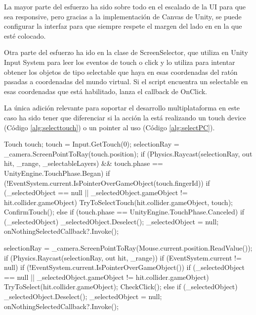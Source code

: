 La mayor parte del esfuerzo ha sido sobre todo en el escalado de la UI para que sea responsive, pero gracias a la implementación de Canvas\cite{unitycanvas} de Unity, se puede configurar la interfaz para que siempre respete el margen del lado en en la que esté colocado.

Otra parte del esfuerzo ha ido en la clase de ScreenSelector, que utiliza en Unity Input System\cite{unityinputsystem} para leer los eventos de touch o click y lo utiliza para intentar obtener los objetos de tipo selectable que haya en esas coordenadas del ratón pasadas a coordenadas del mundo virtual. Si el script encuentra un selectable en esas coordenadas que está habilitado, lanza el callback de OnClick.

La única adición relevante para soportar el desarrollo multiplataforma en este caso ha sido tener que diferenciar si la acción la está realizando un touch device (Código \ref{alg:selecttouch}) o un pointer al uso (Código \ref{alg:selectPC}).

\begin{mypython}[caption={Código para seleccionar una entidad en un 'Touch Device'.},label={alg:selecttouch}]
Touch touch;
touch = Input.GetTouch(0);
selectionRay = _camera.ScreenPointToRay(touch.position);
if (Physics.Raycast(selectionRay, out hit, _range, _selectableLayers) && touch.phase == UnityEngine.TouchPhase.Began)
{
    if (!EventSystem.current.IsPointerOverGameObject(touch.fingerId))
    {
        if (_selectedObject == null || _selectedObject.gameObject != hit.collider.gameObject)
        {
            TryToSelectTouch(hit.collider.gameObject, touch);
        }
        ConfirmTouch();
    }
}
else if (touch.phase == UnityEngine.TouchPhase.Canceled)
{
    if (_selectedObject)
    {
        _selectedObject.Deselect();
        _selectedObject = null;
        onNothingSelectedCallback?.Invoke();
    }
}
\end{mypython}

\begin{mypython}[caption={Código para seleccionar una entidad en PC.},label={alg:selectPC}]
selectionRay = _camera.ScreenPointToRay(Mouse.current.position.ReadValue());
if (Physics.Raycast(selectionRay, out hit, _range))
{
    if (EventSystem.current != null)
    {
        if (!EventSystem.current.IsPointerOverGameObject())
        {
            if (_selectedObject == null || _selectedObject.gameObject != hit.collider.gameObject)
            {
                TryToSelect(hit.collider.gameObject);
            }
            CheckClick();
        }
    }
}
else
{
    if (_selectedObject)
    {
        _selectedObject.Deselect();
        _selectedObject = null;
        onNothingSelectedCallback?.Invoke();
    }
}
\end{mypython}

